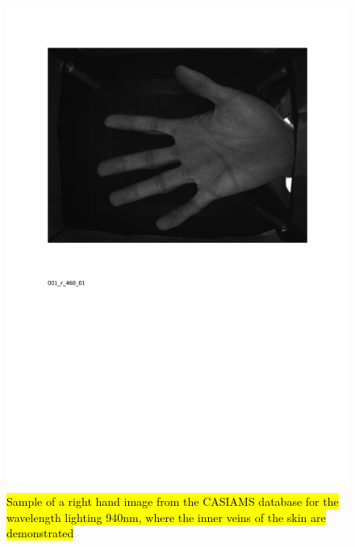 \documentclass[review]{elsarticle}
\begin{document}
		\begin{figure}[!h]
		    \centering
		    \includegraphics[page=5,scale=.57,trim=1cm 14.7cm 1cm 1.7cm,clip]{CASIA_multi_spectral_samples.pdf}
		    \caption{\hl{Sample of a right hand image from the CASIAMS database for the wavelength lighting 940nm, where the inner veins of the skin are demonstrated}}
		    \label{fig:IIT_problematic_rings5}
		\end{figure}
\end{document}
